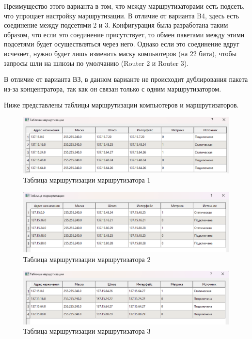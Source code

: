 \documentclass[12pt,onecolumn]{article}
\begin{document}
Преимущество этого варианта в том, что между маршрутизаторами есть подсеть, что упрощает настройку маршрутизации. В отличие от варианта B4, здесь есть соединение между подсетями 2 и 3. Конфигурация была разработана таким образом, что если это соединение присутствует, то обмен пакетами между этими подсетями будет осуществляться через него. Однако если это соединение вдруг исчезнет, нужно будет лишь изменить маску компьютеров (на 22 бита), чтобы запросы шли на шлюзы по умолчанию (Router 2 и Router 3).

В отличие от варианта ВЗ, в данном варианте не происходит дублирования пакета из-за концентратора, так как он связан только с одним маршрутизатором.

Ниже представлены таблицы маршрутизации компьютеров и маршрутизаторов.

\begin{figure}[H]
    \centering
    \includegraphics[width=\textwidth]{image/part-3/router1.png}
    \caption{Таблица маршрутизации маршрутизатора 1}
\end{figure}

\begin{figure}[H]
    \centering
    \includegraphics[width=\textwidth]{image/part-3/router2.png}
    \caption{Таблица маршрутизации маршрутизатора 2}
\end{figure}

\begin{figure}[H]
    \centering
    \includegraphics[width=\textwidth]{image/part-3/router3.png}
    \caption{Таблица маршрутизации маршрутизатора 3}
\end{figure}
\end{document}
